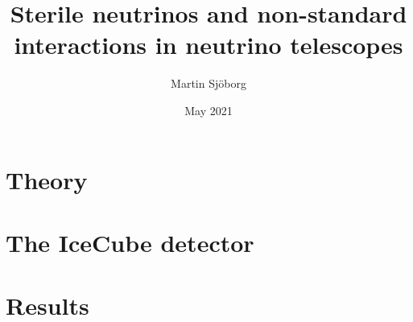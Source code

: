 \documentclass[a4paper,10pt,final,openright,swedish]{thesis}
\title{Sterile neutrinos and non-standard interactions in neutrino telescopes}
\author{Martin Sjöborg}
\date{May 2021}
\begin{document}
\maketitle

\cleardoublepage

%

%

\tableofcontents

%


\mainmatter

\cleardoublepage

\chapter{Theory}\label{ch:theory}




\chapter{The IceCube detector}\label{ch:ic}



\chapter{Results}\label{ch:results}



% 
% 
\end{document}
